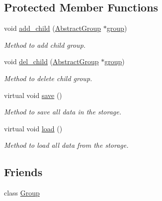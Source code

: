 \subsection*{Protected Member Functions}
\begin{DoxyCompactItemize}
\item 
void \hyperlink{classCore_1_1AbstractGroup_abf219d714e6a17d5e712b2fcb60395d2}{add\_\-child} (\hyperlink{classCore_1_1AbstractGroup}{AbstractGroup} $\ast$\hyperlink{group__content_8h_a27517aa1480ab2d9bfe5d62e693b33eb}{group})
\begin{DoxyCompactList}\small\item\em Method to add child group. \item\end{DoxyCompactList}\item 
void \hyperlink{classCore_1_1AbstractGroup_aa81866b9c414c24d25ca26311b4b4330}{del\_\-child} (\hyperlink{classCore_1_1AbstractGroup}{AbstractGroup} $\ast$\hyperlink{group__content_8h_a27517aa1480ab2d9bfe5d62e693b33eb}{group})
\begin{DoxyCompactList}\small\item\em Method to delete child group. \item\end{DoxyCompactList}\item 
virtual void \hyperlink{classCore_1_1AbstractGroup_ab8cc5ad1c04d67c24af785f9adb2d67c}{save} ()
\begin{DoxyCompactList}\small\item\em Method to save all data in the storage. \item\end{DoxyCompactList}\item 
virtual void \hyperlink{classCore_1_1AbstractGroup_ace41b51dd585a95b61990b69f078a283}{load} ()
\begin{DoxyCompactList}\small\item\em Method to load all data from the storage. \item\end{DoxyCompactList}\end{DoxyCompactItemize}
\subsection*{Friends}
\begin{DoxyCompactItemize}
\item 
class \hyperlink{classCore_1_1AbstractGroup_a2697825715974a353728f0d4d5658112}{Group}
\end{DoxyCompactItemize}


